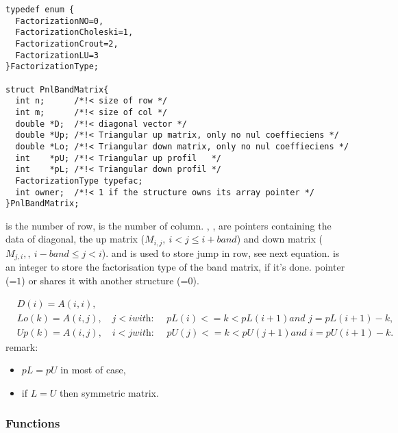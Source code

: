 \begin{verbatim}
typedef enum {
  FactorizationNO=0, 
  FactorizationCholeski=1, 
  FactorizationCrout=2, 
  FactorizationLU=3
}FactorizationType;

struct PnlBandMatrix{
  int n;      /*!< size of row */ 
  int m;      /*!< size of col */ 
  double *D;  /*!< diagonal vector */  
  double *Up; /*!< Triangular up matrix, only no nul coeffieciens */ 
  double *Lo; /*!< Triangular down matrix, only no nul coeffieciens */
  int    *pU; /*!< Triangular up profil   */ 
  int    *pL; /*!< Triangular down profil */
  FactorizationType typefac;
  int owner;  /*!< 1 if the structure owns its array pointer */
}PnlBandMatrix;
\end{verbatim}

 is the number of row,  is the number of column.
, ,   are pointers containing the
data of diagonal, the up matrix ($M_{i, j}, \ i<j\leq i+band$) and  down
matrix ($M_{j, i}, , \ i-band\leq j<i$).
 and  is used to store jump in row, see next equation.
 is an integer to store the factorisation type of the band
matrix, if it's done.
pointer (=$1$) or shares it with another structure (=$0$).


\begin{align*}
  \label{eq:1}
  & D(i) = A(i, i), \nonumber \\
  & Lo(k) = A(i, j), \quad j < i \textit{with: } \quad pL(i)<= k < pL(i+1)
  \textit{and } j = pL(i+1)-k, \\
  & Up(k) =A(i, j), \quad i < j \textit{with: } \quad pU(j)<= k < pU(j+1) \textit{and } i
  = pU(i+1)-k.\nonumber
\end{align*}
remark:
\begin{itemize}
\item $ pL = pU $ in most of case, 
\item if $L = U$ then symmetric matrix.
\end{itemize}


\subsubsection{Functions}
